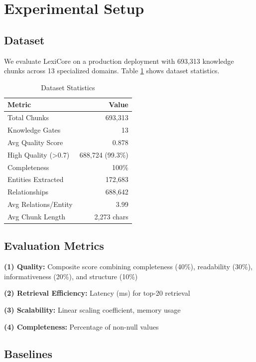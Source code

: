 \documentclass[11pt]{article}
\begin{document}
\section{Experimental Setup}

\subsection{Dataset}

We evaluate LexiCore on a production deployment with 693,313 knowledge chunks across 13 specialized domains. Table \ref{tab:dataset} shows dataset statistics.

\begin{table}[t]
\centering
\caption{Dataset Statistics}
\label{tab:dataset}
\begin{tabular}{lr}
\toprule
\textbf{Metric} & \textbf{Value} \\
\midrule
Total Chunks & 693,313 \\
Knowledge Gates & 13 \\
Avg Quality Score & 0.878 \\
High Quality (>0.7) & 688,724 (99.3\%) \\
Completeness & 100\% \\
Entities Extracted & 172,683 \\
Relationships & 688,642 \\
Avg Relations/Entity & 3.99 \\
Avg Chunk Length & 2,273 chars \\
\bottomrule
\end{tabular}
\end{table}

\subsection{Evaluation Metrics}

\textbf{(1) Quality:} Composite score combining completeness (40\%), readability (30\%), informativeness (20\%), and structure (10\%)

\textbf{(2) Retrieval Efficiency:} Latency (ms) for top-20 retrieval

\textbf{(3) Scalability:} Linear scaling coefficient, memory usage

\textbf{(4) Completeness:} Percentage of non-null values

\subsection{Baselines}
\end{document}
